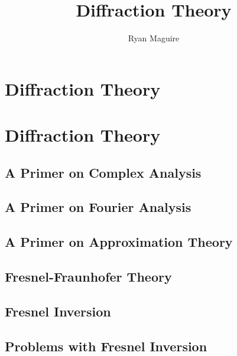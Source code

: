 \documentclass[crop=false,class=book,oneside]{standalone}
\begin{document}
    \ifx\ifplanetdiff\undefined
        \newif\iffunct
        \title{Diffraction Theory}
        \author{Ryan Maguire}
        \date{\vspace{-5ex}}
        \maketitle
        \tableofcontents
        \clearpage
        \chapter*{Diffraction Theory}
        \setcounter{chapter}{4}
    \else
        \chapter{Diffraction Theory}
    \fi
    \section{A Primer on Complex Analysis}
    \section{A Primer on Fourier Analysis}
    \section{A Primer on Approximation Theory}
    \section{Fresnel-Fraunhofer Theory}
    \section{Fresnel Inversion}
    \section{Problems with Fresnel Inversion}
\end{document}
